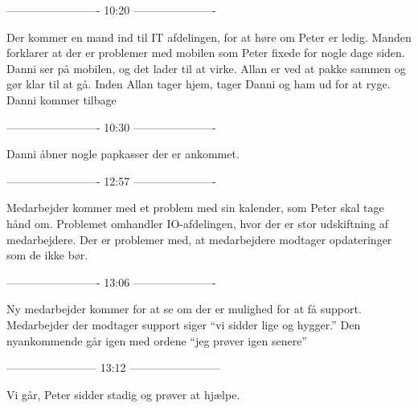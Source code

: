 ------------------------- 10:20 ----------------------

Der kommer en mand ind til IT afdelingen, for at høre om Peter er ledig.
Manden forklarer at der er problemer med mobilen som Peter fixede for nogle dage siden.
Danni ser på mobilen, og det lader til at virke.
Allan er ved at pakke sammen og gør klar til at gå.
Inden Allan tager hjem, tager Danni og ham ud for at ryge.
Danni kommer tilbage

------------------------- 10:30 ----------------------

Danni åbner nogle papkasser der er ankommet.

------------------------- 12:57 ----------------------

Medarbejder kommer med et problem med sin kalender, som Peter skal tage hånd om.
Problemet omhandler IO-afdelingen, hvor der er stor udskiftning af medarbejdere.
Der er problemer med, at medarbejdere modtager opdateringer som de ikke bør.

------------------------- 13:06 ----------------------

Ny medarbejder kommer for at se om der er mulighed for at få support.
Medarbejder der modtager support siger “vi sidder lige og hygger.”
Den nyankommende går igen med ordene “jeg prøver igen senere”

------------------------ 13:12 ------------------------

Vi går, Peter sidder stadig og prøver at hjælpe.